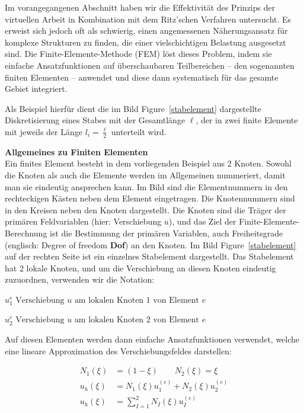 Im vorangegangenen Abschnitt haben wir die Effektivität des Prinzips der virtuellen Arbeit in Kombination mit dem Ritz'schen Verfahren untersucht. Es erweist sich jedoch oft als schwierig, einen angemessenen Näherungsansatz für komplexe Strukturen zu finden, die einer vielschichtigen Belastung ausgesetzt sind. Die Finite-Elemente-Methode (FEM) löst dieses Problem, indem sie einfache Ansatzfunktionen auf überschaubaren Teilbereichen -- den sogenannten finiten Elementen -- anwendet und diese dann systematisch für das gesamte Gebiet integriert.

Als Beispiel hierfür dient die im Bild Figure~\ref{stabelement} dargestellte Diskretisierung eines Stabes mit der Gesamtlänge $\ell$, der in zwei finite Elemente mit jeweils der Länge $l_i = \frac{\ell}{2}$ unterteilt wird.

\begin{framed}
\textbf{Allgemeines zu Finiten Elementen}\\
Ein finites Element besteht in dem vorliegenden Beispiel aus 2 Knoten. Sowohl die Knoten als auch die Elemente werden im Allgemeinen nummeriert, damit man sie eindeutig ansprechen kann. Im Bild sind die Elementnummern in den rechteckigen Kästen neben dem Element eingetragen. Die Knotennummern sind in den Kreisen neben den Knoten dargestellt. Die Knoten sind die Träger der primären Feldvariablen (hier: Verschiebung $u$), und das Ziel der Finite-Elemente-Berechnung ist die Bestimmung der primären Variablen, auch Freiheitsgrade (englisch: Degree of freedom \textbf{Dof}) an den Knoten. Im Bild Figure~\ref{stabelement} auf der rechten Seite ist ein einzelnes Stabelement dargestellt. Das Stabelement hat 2 lokale Knoten, und um die Verschiebung an diesen Knoten eindeutig zuzuordnen, verwenden wir die Notation:

$u_1^{e} \text{ Verschiebung } u \text{ am lokalen Knoten 1 von Element } e$

$u_2^{e} \text{ Verschiebung } u \text{ am lokalen Knoten 2 von Element } e$
\end{framed}

Auf diesen Elementen werden dann einfache Ansatzfunktionen verwendet, welche eine lineare Approximation des Verschiebungsfeldes darstellen:

\begin{align}
 N_1(\xi) & = (1-\xi) \qquad N_2(\xi)= \xi  \\
 u_h(\xi) & = N_1(\xi) u_1^{(e)}+ N_2(\xi) u_2^{(e)} \\
 u_h(\xi) & = \sum_{I=1}^2 N_I(\xi) u_I^{(e)}
 \end{align}

